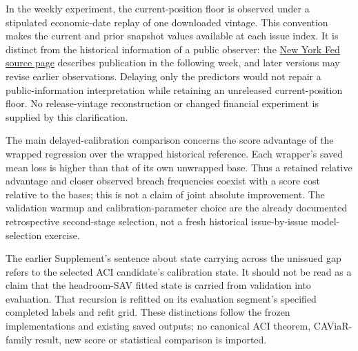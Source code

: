 In the weekly experiment, the current-position floor is observed under a
stipulated economic-date replay of one downloaded vintage. This convention
makes the current and prior snapshot values available at each issue index.
It is distinct from the historical information of a public observer: the
\href{https://www.newyorkfed.org/markets/counterparties/primary-dealers-statistics}{New
York Fed source page} describes publication in the following week, and
later versions may revise earlier observations. Delaying only the predictors
would not repair a public-information interpretation while retaining an
unreleased current-position floor. No release-vintage reconstruction or
changed financial experiment is supplied by this clarification.

The main delayed-calibration comparison concerns the score advantage of the
wrapped regression over the wrapped historical reference. Each wrapper's
saved mean loss is higher than that of its own unwrapped base. Thus a retained
relative advantage and closer observed breach frequencies coexist with a
score cost relative to the bases; this is not a claim of joint absolute
improvement. The validation warmup and calibration-parameter choice are the
already documented retrospective second-stage selection, not a fresh
historical issue-by-issue model-selection exercise.

The earlier Supplement's sentence about state carrying across the unissued
gap refers to the selected ACI candidate's calibration state. It should not
be read as a claim that the headroom-SAV fitted state is carried from validation
into evaluation. That recursion is refitted on its evaluation segment's
specified completed labels and refit grid. These distinctions follow the
frozen implementations and existing saved outputs; no canonical ACI theorem,
CAViaR-family result, new score or statistical comparison is imported.
